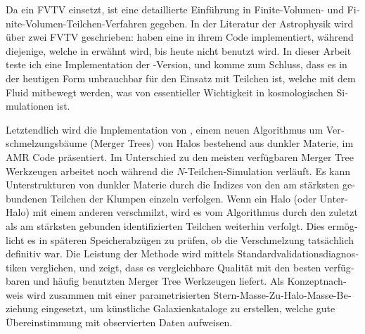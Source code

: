 \begin{otherlanguage}{german}
Da \GEARRT ein FVTV einsetzt, ist eine detaillierte Einf\"uhrung in Finite-Volumen- und
Finite-Volumen-Teilchen-Verfahren gegeben. In der Literatur der Astrophysik wird \"uber zwei FVTV
geschrieben: \cite{hopkinsGIZMONewClass2015} haben eine in ihrem  Code implementiert,
w\"ahrend diejenige, welche in \cite{ivanovaCommonEnvelopeEvolution2013} erw\"ahnt wird, bis heute
nicht benutzt wird. In dieser Arbeit teste ich eine Implementation der
\cite{ivanovaCommonEnvelopeEvolution2013}-Version, und komme zum Schluss, dass es in der heutigen
Form unbrauchbar f\"ur den Einsatz mit Teilchen ist, welche mit dem Fluid mitbewegt werden, was
von essentieller Wichtigkeit in kosmologischen Simulationen ist.


Letztendlich wird die Implementation von \acacia, einem neuen Algorithmus um Verschmelzungsb\"aume
(Merger Trees) von Halos bestehend aus dunkler Materie, im AMR Code \ramses pr\"asentiert. Im
Unterschied zu den meisten verf\"ugbaren Merger Tree Werkzeugen arbeitet \acacia noch w\"ahrend die
$N$-Teilchen-Simulation verl\"auft. Es kann Unterstrukturen von dunkler Materie durch die Indizes
von den am st\"arksten gebundenen Teilchen der Klumpen einzeln verfolgen. Wenn ein Halo (oder
Unter-Halo) mit einem anderen verschmilzt, wird es vom Algorithmus durch den zuletzt als am
st\"arksten gebunden identifizierten Teilchen weiterhin verfolgt. Dies erm\"oglicht es in sp\"ateren
Speicherabz\"ugen zu pr\"ufen, ob die Verschmelzung tats\"achlich definitiv war. Die Leistung der
Methode wird mittels Standardvalidationsdiagnostiken verglichen, und zeigt, dass es vergleichbare
Qualit\"at mit den besten verf\"ugbaren und h\"aufig benutzten Merger Tree Werkzeugen liefert. Als
Konzeptnachweis wird \acacia zusammen mit einer parametrisierten Stern-Masse-Zu-Halo-Masse-Beziehung
eingesetzt, um k\"unstliche Galaxienkataloge zu erstellen, welche gute \"Ubereinstimmung mit
observierten Daten aufweisen.

\end{otherlanguage}
